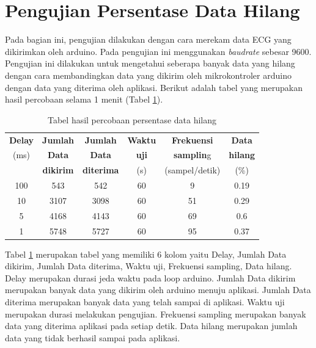\section{Pengujian Persentase Data Hilang}
\vspace{1ex}
Pada bagian ini, pengujian dilakukan dengan cara merekam data ECG yang dikirimkan oleh arduino. Pada pengujian ini menggunakan \textit{baudrate} sebesar 9600. Pengujian ini dilakukan untuk mengetahui seberapa banyak data yang hilang dengan cara membandingkan data yang dikirim oleh mikrokontroler arduino dengan data yang diterima oleh aplikasi. Berikut adalah tabel yang merupakan hasil percobaan selama 1 menit (Tabel \ref{tabel:4.1}).
\begin{table}[H]
	\caption{Tabel hasil percobaan persentase data hilang}
	\begin{tabular}{|c|c|c|c|c|c|}
		\hline
		\multicolumn{1}{|c|}{{\color[HTML]{000000} \textbf{Delay}}} & \multicolumn{1}{|c|}{\textbf{Jumlah}} &
		\multicolumn{1}{|c|}{ \textbf{Jumlah}} &
		\multicolumn{1}{|c|}{\textbf{Waktu}} &
		\multicolumn{1}{|c|}{\textbf{Frekuensi}} &
		\multicolumn{1}{|c|}{\textbf{Data}} \\
		(ms) & \textbf{Data} & \textbf{Data} & \textbf{uji} & \textbf{samplin}g & \textbf{hilang } \\
		& \textbf{dikirim} & \textbf{diterima} & (s)  & (sampel/detik) & (\%) \\ \hline
		100 & 543 & 542 & 60 & 9 & 0.19 \\ \hline 
		10 & 3107 & 3098 & 60 & 51 & 0.29 \\ \hline
		5 & 4168 & 4143 & 60 & 69 & 0.6 \\ \hline
		1 & 5748 & 5727 & 60 & 95 & 0.37 \\ \hline
			
	\end{tabular}
	\vspace{1ex}
	
	\label{tabel:4.1}
\end{table}
Tabel \ref{tabel:4.1} merupakan tabel yang memiliki 6 kolom yaitu Delay, Jumlah Data dikirim, Jumlah Data diterima, Waktu uji, Frekuensi sampling, Data hilang. Delay merupakan durasi jeda waktu pada loop arduino. Jumlah Data dikirim merupakan banyak data yang dikirim oleh arduino menuju aplikasi. Jumlah Data diterima merupakan banyak data yang telah sampai di aplikasi. Waktu uji merupakan durasi melakukan pengujian. Frekuensi sampling merupakan banyak data yang diterima aplikasi pada setiap detik. Data hilang merupakan jumlah data yang tidak berhasil sampai pada aplikasi.

